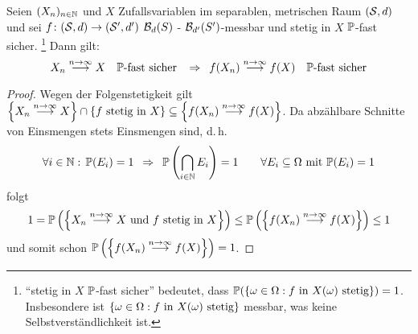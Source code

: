 \begin{satz} \label{satz: 3.8}
	Seien $(X_n)_{n \in \N}$ und $X$ Zufallsvariablen im separablen, metrischen Raum $(\S,d)$ und sei $f \colon (\S,d) \to (\S',d')$ $\B_d(S)$ - $\B_{d'}(S')$-messbar und stetig in $X$ $\P$-fast sicher.
	\footnote{\enquote{stetig in $X$ $\P$-fast sicher} bedeutet,
		dass $\P(\menge{\omega  \in  \Omega : f \text{ in } X(\omega) \text{ stetig}}) = 1$. Insbesondere ist $\menge{\omega  \in  \Omega : f \text{ in } X(\omega) \text{ stetig}}$ messbar, was keine Selbstverständlichkeit ist.}
	Dann gilt:
	\begin{equation*}
		X_n \ntoinf	X \quad \P\text{-fast sicher }
		\follows f(X_n) \ntoinf f(X) \quad \P\text{-fast sicher}
	\end{equation*}
\end{satz}

\begin{proof}
	Wegen der Folgenstetigkeit gilt $\menge{X_n \ntoinf  X} \cap \menge{f \text{ stetig in }X}
		\subseteq
		\menge{f(X_n) \ntoinf f(X)}$.
	Da abzählbare Schnitte von Einsmengen stets Einsmengen sind, d.\,h.
	\begin{equation*}
		\forall i \in \N : \, \P(E_i)=1
		\follows \P\brackets{\bigcap_{i \in \N} E_i}=1
		\qquad \forall E_i \subseteq \Omega \mit \P(E_i)=1
	\end{equation*}
	folgt 
	\begin{equation*}
		1 = \P\brackets{\menge{X_n \ntoinf X \text{ und $f$ stetig in } X}} \le\P\brackets{\menge{f(X_n) \ntoinf  f(X)}} \le 1
	\end{equation*}
	und somit schon $\P\brackets{\menge{f(X_n) \ntoinf  f(X)}} = 1$.
\end{proof}

